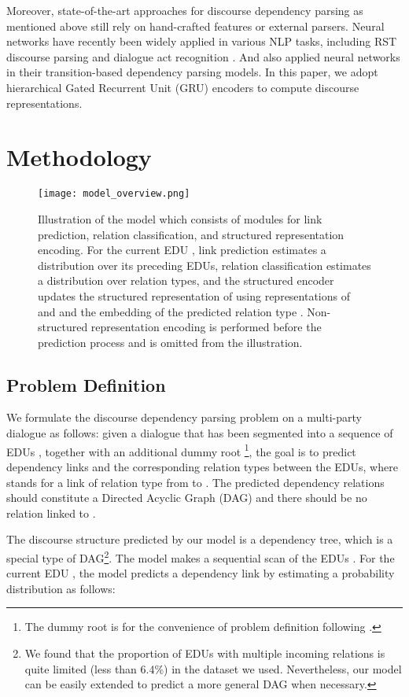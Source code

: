 \documentclass[letterpaper]{article} \usepackage{aaai19}  \usepackage{times}  \usepackage{helvet}  \usepackage{courier}  \usepackage{url}  \usepackage{graphicx}  \usepackage{amssymb}
\begin{document}
Moreover, state-of-the-art approaches for discourse dependency parsing as mentioned above still rely on hand-crafted features or external parsers. 
Neural networks have recently been widely applied in various NLP tasks, including RST discourse parsing \cite{li2016discourse,braud2017cross} and dialogue act recognition \cite{kumar2018dialogue,chen2018dialogue}. 
And \cite{jia2018improved,jia2018modeling} also applied neural networks in their transition-based dependency parsing models. 
In this paper, we adopt hierarchical Gated Recurrent Unit (GRU) \cite{cholearning} encoders to compute discourse representations.

\section{Methodology}

\begin{figure*}[ht]
	\centering
	\texttt{[image: model\_overview.png]}
	\caption{Illustration of the model which consists of modules for link prediction, relation classification, and structured representation encoding. For the current EDU , link prediction estimates a distribution over its preceding EDUs, relation classification estimates a distribution over relation types, and the structured encoder updates the structured representation of  using representations of  and  and the embedding of the predicted relation type . 
	Non-structured representation encoding is performed before the prediction process and is omitted from the illustration.
	}
	\label{model_overview}
\end{figure*}

\subsection{Problem Definition}
We formulate the discourse dependency parsing problem on a  multi-party dialogue as follows:
given a dialogue that has been segmented into a sequence of EDUs 
, together with an additional dummy root \footnote{The dummy root is for the convenience of problem definition following \cite{li2014text}.
},
the goal is to predict dependency links and the corresponding relation types 
between the EDUs, where  stands for a link of relation type  from  to .
The predicted dependency relations should constitute a Directed Acyclic Graph (DAG) and there should be no relation linked to .

The discourse structure predicted by our model is a dependency tree, which is a special type of DAG\footnote{We found that the proportion of EDUs with multiple incoming relations is quite limited (less than 6.4\%) in the dataset we used. Nevertheless, our model can be easily extended to predict a more general DAG when necessary.}.
The model makes a sequential scan of the EDUs . For the current EDU , the model predicts a dependency link by estimating a probability distribution as follows:
\end{document}
